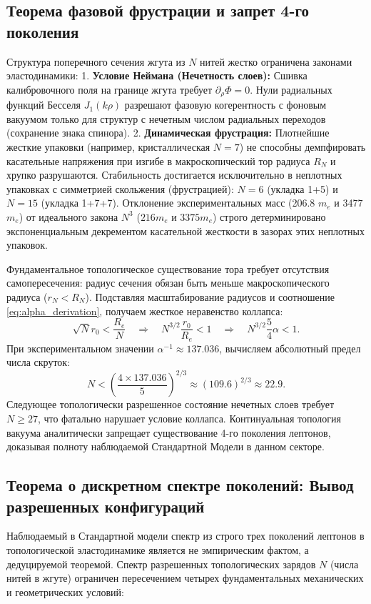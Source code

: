 \documentclass[11pt,a4paper]{article}
\begin{document}
\subsection{Теорема фазовой фрустрации и запрет 4-го поколения}
Структура поперечного сечения жгута из $N$ нитей жестко ограничена законами эластодинамики:
1. \textbf{Условие Неймана (Нечетность слоев):} Сшивка калибровочного поля на границе жгута требует $\partial_\rho \Phi = 0$. Нули радиальных функций Бесселя $J_1(k\rho)$ разрешают фазовую когерентность с фоновым вакуумом только для структур с нечетным числом радиальных переходов (сохранение знака спинора).
2. \textbf{Динамическая фрустрация:} Плотнейшие жесткие упаковки (например, кристаллическая $N=7$) не способны демпфировать касательные напряжения при изгибе в макроскопический тор радиуса $R_N$ и хрупко разрушаются. Стабильность достигается исключительно в неплотных упаковках с симметрией скольжения (фрустрацией): $N=6$ (укладка 1+5) и $N=15$ (укладка 1+7+7).
Отклонение экспериментальных масс (206.8 $m_e$ и 3477 $m_e$) от идеального закона $N^3$ ($216 m_e$ и $3375 m_e$) строго детерминировано экспоненциальным декрементом касательной жесткости в зазорах этих неплотных упаковок.
	
Фундаментальное топологическое существование тора требует отсутствия самопересечения: радиус сечения обязан быть меньше макроскопического радиуса ($r_N < R_N$). Подставляя масштабирование радиусов и соотношение \eqref{eq:alpha_derivation}, получаем жесткое неравенство коллапса:
\begin{equation}
\sqrt{N} r_0 < \frac{R_e}{N} \quad \Longrightarrow \quad N^{3/2} \frac{r_0}{R_e} < 1 \quad \Longrightarrow \quad N^{3/2} \frac{5}{4}\alpha < 1.
\end{equation}
При экспериментальном значении $\alpha^{-1} \approx 137.036$, вычисляем абсолютный предел числа скруток:
\begin{equation}
N < \left( \frac{4 \times 137.036}{5} \right)^{2/3} \approx (109.6)^{2/3} \approx 22.9.
\end{equation}
Следующее топологически разрешенное состояние нечетных слоев требует $N \ge 27$, что фатально нарушает условие коллапса. Континуальная топология вакуума аналитически запрещает существование 4-го поколения лептонов, доказывая полноту наблюдаемой Стандартной Модели в данном секторе.

\subsection{Теорема о дискретном спектре поколений: Вывод разрешенных конфигураций}
Наблюдаемый в Стандартной модели спектр из строго трех поколений лептонов в топологической эластодинамике является не эмпирическим фактом, а дедуцируемой теоремой. Спектр разрешенных топологических зарядов $N$ (числа нитей в жгуте) ограничен пересечением четырех фундаментальных механических и геометрических условий:
\end{document}
